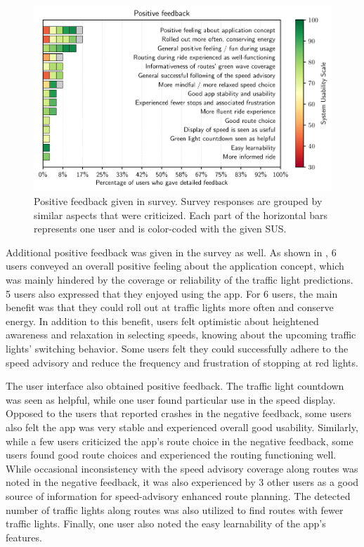 \begin{figure}[t]
\caption{Positive feedback given in survey. Survey responses are grouped by similar aspects that were criticized. Each part of the horizontal bars represents one user and is color-coded with the given SUS.}\label{fig:app-positive-feedback}
\includegraphics[width=\linewidth]{images/app-feedback-positive.pdf}
\end{figure}

Additional positive feedback was given in the survey as well. As shown in , 6 users conveyed an overall positive feeling about the application concept, which was mainly hindered by the coverage or reliability of the traffic light predictions. 5 users also expressed that they enjoyed using the app. For 6 users, the main benefit was that they could roll out at traffic lights more often and conserve energy. In addition to this benefit, users felt optimistic about heightened awareness and relaxation in selecting speeds, knowing about the upcoming traffic lights' switching behavior. Some users felt they could successfully adhere to the speed advisory and reduce the frequency and frustration of stopping at red lights.

The user interface also obtained positive feedback. The traffic light countdown was seen as helpful, while one user found particular use in the speed display. Opposed to the users that reported crashes in the negative feedback, some users also felt the app was very stable and experienced overall good usability. Similarly, while a few users criticized the app's route choice in the negative feedback, some users found good route choices and experienced the routing functioning well. While occasional inconsistency with the speed advisory coverage along routes was noted in the negative feedback, it was also experienced by 3 other users as a good source of information for speed-advisory enhanced route planning. The detected number of traffic lights along routes was also utilized to find routes with fewer traffic lights. Finally, one user also noted the easy learnability of the app's features.


